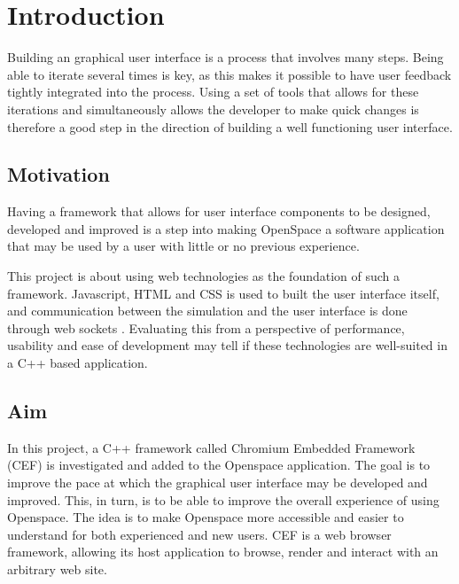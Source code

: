 \chapter{Introduction}
\label{cha:introduction}

Building an graphical user interface is a process that involves many steps.   Being able to iterate several times is key, as this makes it possible to have user feedback tightly integrated into the process. Using a set of tools that allows for these iterations and simultaneously allows the developer to make quick changes is therefore a good step in the direction of building a well functioning user interface.

\section{Motivation}
\label{sec:motivation}


Having a framework that allows for user interface components to be designed, developed and improved is a step into making OpenSpace \cite{jossos} a software application that may be used by a user with little or no previous experience.

This project is about using web technologies as the foundation of such a framework. Javascript, HTML and CSS  is used to built the user interface itself, and communication between the simulation and the user interface is done through web sockets \cite{fette2011websocket}. Evaluating this from a perspective of performance, usability and ease of development may tell if these technologies are well-suited in a C++ based application.

\section{Aim}
\label{sec:aim}


In this project, a C++ framework called Chromium Embedded Framework (CEF) is investigated and added to the Openspace application. The goal is to improve the pace at which the graphical user interface may be developed and improved. This, in turn, is to be able to improve the overall experience of using Openspace. The idea is to make Openspace more accessible and easier to understand for both experienced and new users. CEF is a web browser framework, allowing its host application to browse, render and interact with an arbitrary web site.

